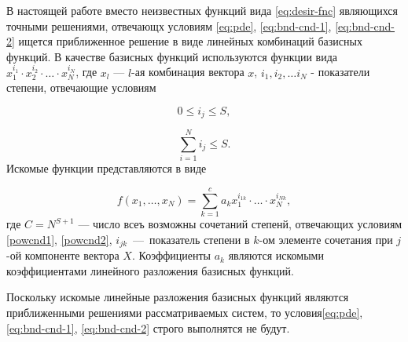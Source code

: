 \documentclass[a4paper,12pt]{article}
\begin{document}
В настоящей работе вместо неизвестных функций вида \eqref{eq:desir-fnc}
являющихся точными решениями, отвечающх условиям \eqref{eq:pde},
\eqref{eq:bnd-cnd-1}, \eqref{eq:bnd-cnd-2} ищется приближенное решение
в виде линейных комбинаций базисных функций. В качестве базисных функций
используются функции вида $x^{i_1}_1 \cdot x^{i_2}_2 \cdot \ldots \cdot
x^{i_N}_N$, где $x_l$ --- $l$-ая комбинация вектора $x$, $i_1,i_2,\ldots
i_N$ - показатели степени, отвечающие условиям

\begin{equation}
    0 \le i_j \le S,
    \label{powcnd1}
\end{equation}

\begin{equation}
    \sum^{N}_{i=1} i_j \le S.
    \label{powcnd2}
\end{equation}
Искомые функции представляются в виде

\begin{equation}
    f(x_1,\ldots,x_N)=\sum^{c}_{k=1} a_kx^{i_{1k}}_1 
    \cdot\ldots\cdot x^{i_{Nk}}_N,
\end{equation}
где $C=N^{S+1}$ --- число всеъ возможны сочетаний степенй, отвечающих 
условиям \eqref{powcnd1}, \eqref{powcnd2}, $i_{jk}$~---~показатель степени
в $k$-ом элементе сочетания при $j$-ой компоненте вектора $X$. Коэффициенты
$a_k$ являются искомыми коэффициентами линейного разложения базисных 
функций.

Поскольку искомые линейные разложения базисных функций являются 
приближенными решениями рассматриваемых систем, то условия\eqref{eq:pde},
\eqref{eq:bnd-cnd-1}, \eqref{eq:bnd-cnd-2} строго выполнятся не будут.
\end{document}
